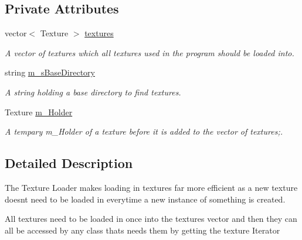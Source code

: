 \subsection*{Private Attributes}
\begin{DoxyCompactItemize}
\item 
\hypertarget{class_texture_loader_aebdefad4be5b524ed9181c2eb2d7c7d3}{}vector$<$ Texture $>$ \hyperlink{class_texture_loader_aebdefad4be5b524ed9181c2eb2d7c7d3}{textures}\label{class_texture_loader_aebdefad4be5b524ed9181c2eb2d7c7d3}

\begin{DoxyCompactList}\small\item\em A vector of textures which all textures used in the program should be loaded into. \end{DoxyCompactList}\item 
\hypertarget{class_texture_loader_a622f8e4f8807763a6260450345295a0f}{}string \hyperlink{class_texture_loader_a622f8e4f8807763a6260450345295a0f}{m\+\_\+s\+Base\+Directory}\label{class_texture_loader_a622f8e4f8807763a6260450345295a0f}

\begin{DoxyCompactList}\small\item\em A string holding a base directory to find textures. \end{DoxyCompactList}\item 
\hypertarget{class_texture_loader_a76329b161e033d8c5284025c58142382}{}Texture \hyperlink{class_texture_loader_a76329b161e033d8c5284025c58142382}{m\+\_\+\+Holder}\label{class_texture_loader_a76329b161e033d8c5284025c58142382}

\begin{DoxyCompactList}\small\item\em A tempary m\+\_\+\+Holder of a texture before it is added to the vector of textures;. \end{DoxyCompactList}\end{DoxyCompactItemize}


\subsection{Detailed Description}
The Texture Loader makes loading in textures far more efficient as a new texture doesn\textquotesingle{}t need to be loaded in everytime a new instance of something is created.

All textures need to be loaded in once into the textures vector and then they can all be accessed by any class thats needs them by getting the texture Iterator

